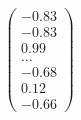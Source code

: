 \documentclass[preview]{standalone}
\begin{document}
\begin{align*}
\begin{pmatrix} -0.83 \\ -0.83 \\ 0.99 \\ \dots \\ -0.68 \\ 0.12 \\ -0.66 \end{pmatrix}
\end{align*}
\end{document}
